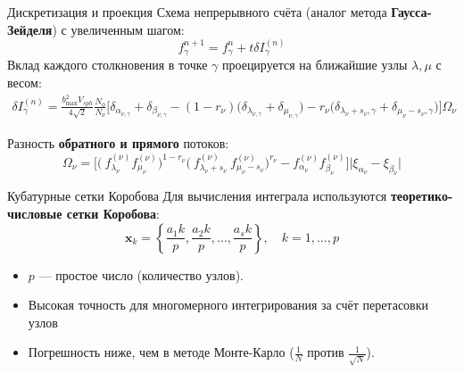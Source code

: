 \documentclass[aspectratio=169]{beamer}
\begin{document}
    \begin{frame}{Дискретизация и проекция}
        Схема непрерывного счёта (аналог метода \textbf{Гаусса-Зейделя}) с увеличенным шагом:
        \[ f_\gamma^{n+1} = f_\gamma^n + t \delta I_\gamma^{(n)} \]
        Вклад каждого столкновения в точке $\gamma$ проецируется на ближайшие узлы $\lambda, \mu$ с весом:
        \begin{multline*}
            \delta I_\gamma^{(n)} = \frac{b^2_{\max} V_{sph}}{4\sqrt{2}} \frac{N_0}{N_\nu} \Big[ \delta_{\alpha_{\nu,
            \gamma}} + \delta_{\beta_{\nu, \gamma}} - (1 - r_\nu) \big( \delta_{\lambda_{\nu, \gamma}} +
            \delta_{\mu_{\nu, \gamma}} \big)- r_\nu \big( \delta_{\lambda_\nu + s_\nu, \gamma} + \delta_{\mu_\nu -
            s_\nu, \gamma} \big) \Big] \Omega_\nu
        \end{multline*}
        
        Разность \textbf{обратного и прямого} потоков:
        \begin{equation*}
            \Omega_\nu = \Big[ \big(~f_{\lambda_\nu}^{(\nu)} f_{\mu_\nu}^{(\nu)} \big)^{1 - r_\nu}
            \big(~f_{\lambda_\nu + s_\nu}^{(\nu)}~f_{\mu_\nu - s_\nu}^{(\nu)} \big)^{r_\nu} - f_{\alpha_\nu}^{(\nu)}
            f_{\beta_\nu}^{(\nu)} \Big] \Big| \xi_{\alpha_\nu} - \xi_{\beta_\nu} \Big|
        \end{equation*}
    \end{frame}

    \begin{frame}{Кубатурные сетки Коробова}
        Для вычисления интеграла используются \textbf{теоретико-числовые сетки Коробова}:
        \[ \mathbf{x}_k = \left\{ \frac{a_1 k}{p}, \frac{a_2 k}{p}, \dots, \frac{a_s k}{p} \right\}, \quad k=1, \dots, p \]
        \begin{itemize}
            \item $p$ — простое число (количество узлов).
            \item Высокая точность для многомерного интегрирования за счёт перетасовки узлов
            \item Погрешность ниже, чем в методе Монте-Карло ($\frac{1}{N}$ против $\frac{1}{\sqrt{N}}$).
        \end{itemize}
    \end{frame}
\end{document}
